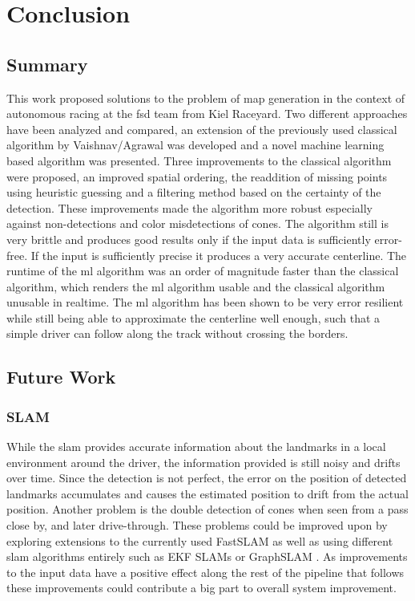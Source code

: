 \chapter{Conclusion}
\label{chap:end}

\section{Summary}
This work proposed solutions to the problem of map generation in the context of autonomous racing at the \ac{fsd} team from Kiel Raceyard. Two different approaches have been analyzed and compared, an extension of the previously used classical algorithm by Vaishnav/Agrawal was developed and a novel machine learning based algorithm was presented. Three improvements to the classical algorithm were proposed, an improved spatial ordering, the readdition of missing points using heuristic guessing and a filtering method based on the certainty of the detection. These improvements made the algorithm more robust especially against non-detections and color misdetections of cones. The algorithm still is very brittle and produces good results only if the input data is sufficiently error-free. If the input is sufficiently precise it produces a very accurate centerline. The runtime of the \ac{ml} algorithm was an order of magnitude faster than the classical algorithm, which renders the \ac{ml} algorithm usable and the classical algorithm unusable in realtime. The \ac{ml} algorithm has been shown to be very error resilient while still being able to approximate the centerline well enough, such that a simple driver can follow along the track without crossing the borders.

\section{Future Work}
\subsection{SLAM} 
While the \ac{slam} provides accurate information about the landmarks in a local environment around the driver, the information provided is still noisy and drifts over time. Since the detection is not perfect, the error on the position of detected landmarks accumulates and causes the estimated position to drift from the actual position. Another problem is the double detection of cones when seen from a pass close by, and later drive-through. These problems could be improved upon by exploring extensions to the currently used FastSLAM \cite{FastSLAM2002} as well as using different \ac{slam} algorithms entirely such as EKF SLAMs \cite{EKFSLAM1986} or GraphSLAM \cite{graphSLAM2006}. As improvements to the input data have a positive effect along the rest of the pipeline that follows these improvements could contribute a big part to overall system improvement.
